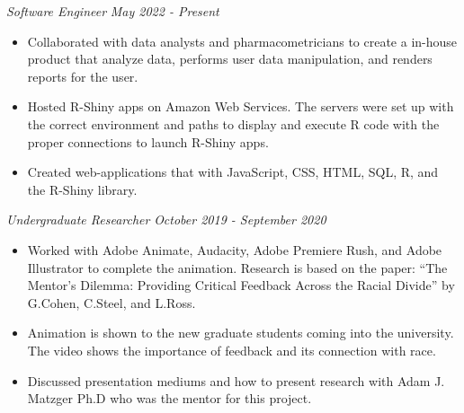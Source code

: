 \documentclass[11pt]{article}
\begin{document}
\textbf{\scalebox{1.2}{Ann Arbor Pharmacometrics Group}} \hfill \scalebox{1.1}{Ann Arbor, Michigan}
\par \textit{Software Engineer} \hfill \textit{May 2022 - Present}
{\small
\begin{itemize}
    \item Collaborated with data analysts and pharmacometricians to create a in-house product that analyze data, performs user data manipulation, and renders reports for the user. 
    \item Hosted R-Shiny apps on Amazon Web Services. The servers were set up with the correct environment and paths to display and execute R code with the proper connections to launch R-Shiny apps.
    \item Created web-applications that with JavaScript, CSS, HTML, SQL, R, and the R-Shiny library. 
\end{itemize}
}

\textbf{\scalebox{1.2}{ Rackham Graduate School - University of Michigan}} \hfill \scalebox{1.1}{Ann Arbor, Michigan}
\par \textit{Undergraduate Researcher} \hfill \textit{October 2019 - September 2020}
{\small
\begin{itemize}
    \item Worked with Adobe Animate, Audacity, Adobe Premiere Rush, and Adobe Illustrator to complete the animation. Research is based on the paper: “The Mentor’s Dilemma: Providing Critical Feedback Across the Racial Divide” by G.Cohen, C.Steel, and L.Ross. 
    \item Animation is shown to the new graduate students coming into the university. The video shows the importance of feedback and its connection with race. 
    \item Discussed presentation mediums and how to present research with Adam J. Matzger Ph.D who was the mentor for this project.
\end{itemize}
}
\end{document}
